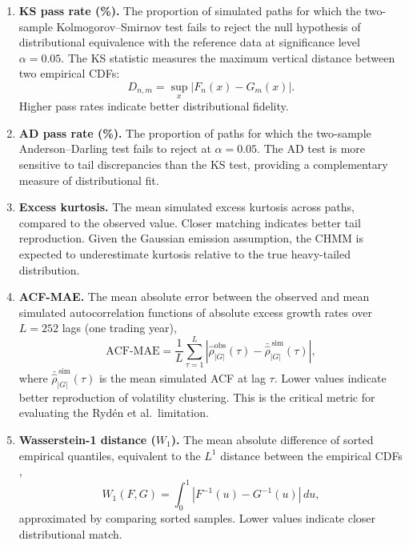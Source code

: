 \begin{enumerate}
    \item \textbf{KS pass rate (\%).}
    The proportion of simulated paths for which the two-sample Kolmogorov--Smirnov test \cite{kolmogorov1933, smirnov1948} fails to reject the null hypothesis of distributional equivalence with the reference data at significance level $\alpha = 0.05$.
    The KS statistic measures the maximum vertical distance between two empirical CDFs:
    \begin{equation}
        D_{n,m} = \sup_x |F_n(x) - G_m(x)|.
        \label{eq:ks}
    \end{equation}
    Higher pass rates indicate better distributional fidelity.

    \item \textbf{AD pass rate (\%).}
    The proportion of paths for which the two-sample Anderson--Darling test fails to reject at $\alpha = 0.05$.
    The AD test is more sensitive to tail discrepancies than the KS test, providing a complementary measure of distributional fit.

    \item \textbf{Excess kurtosis.}
    The mean simulated excess kurtosis across paths, compared to the observed value.
    Closer matching indicates better tail reproduction.
    Given the Gaussian emission assumption, the CHMM is expected to underestimate kurtosis relative to the true heavy-tailed distribution.

    \item \textbf{ACF-MAE.}
    The mean absolute error between the observed and mean simulated autocorrelation functions of absolute excess growth rates over $L = 252$ lags (one trading year),
    \begin{equation}
        \text{ACF-MAE} = \frac{1}{L} \sum_{\tau=1}^{L} \left|\hat{\rho}^{\text{obs}}_{|G|}(\tau) - \bar{\hat{\rho}}^{\,\text{sim}}_{|G|}(\tau)\right|,
        \label{eq:acf_mae}
    \end{equation}
    where $\bar{\hat{\rho}}^{\,\text{sim}}_{|G|}(\tau)$ is the mean simulated ACF at lag $\tau$.
    Lower values indicate better reproduction of volatility clustering.
    This is the critical metric for evaluating the Ryd\'{e}n et al.\ limitation.

    \item \textbf{Wasserstein-1 distance ($W_1$).}
    The mean absolute difference of sorted empirical quantiles, equivalent to the $L^1$ distance between the empirical CDFs \cite{glasserman2003monte},
    \begin{equation}
        W_1(F, G) = \int_0^1 |F^{-1}(u) - G^{-1}(u)|\,du,
        \label{eq:wasserstein}
    \end{equation}
    approximated by comparing sorted samples.
    Lower values indicate closer distributional match.


\end{enumerate}
